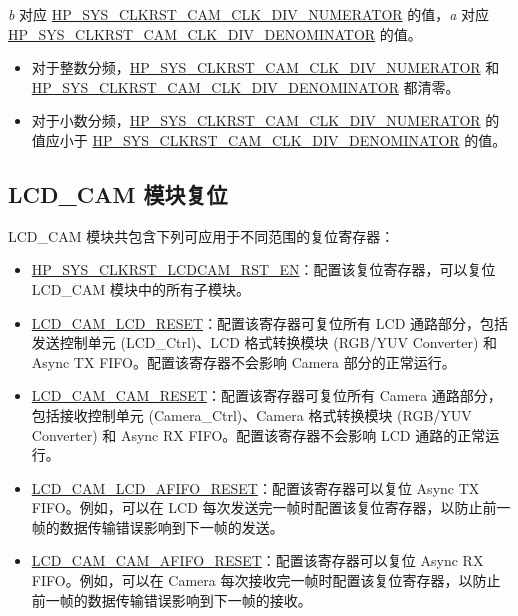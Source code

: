 \documentclass[main\_\_CN.tex]{subfiles}
\begin{document}
\textit{b} 对应 \hyperref[fielddesc:HPSYSCLKRSTCAMCLKDIVNUMERATOR]{HP\_SYS\_CLKRST\_CAM\_CLK\_DIV\_NUMERATOR} 的值，\textit{a} 对应 \hyperref[fielddesc:HPSYSCLKRSTCAMCLKDIVDENOMINATOR]{HP\_SYS\_CLKRST\_CAM\_CLK\_DIV\_DENOMINATOR} 的值。
\begin{itemize}
    \item 对于整数分频，\hyperref[fielddesc:HPSYSCLKRSTCAMCLKDIVNUMERATOR]{HP\_SYS\_CLKRST\_CAM\_CLK\_DIV\_NUMERATOR} 和 \hyperref[fielddesc:HPSYSCLKRSTCAMCLKDIVDENOMINATOR]{HP\_SYS\_CLKRST\_CAM\_CLK\_DIV\_DENOMINATOR} 都清零。
    \item 对于小数分频，\hyperref[fielddesc:HPSYSCLKRSTCAMCLKDIVNUMERATOR]{HP\_SYS\_CLKRST\_CAM\_CLK\_DIV\_NUMERATOR} 的值应小于 \hyperref[fielddesc:HPSYSCLKRSTCAMCLKDIVDENOMINATOR]{HP\_SYS\_CLKRST\_CAM\_CLK\_DIV\_DENOMINATOR} 的值。
\end{itemize}

\subsection{LCD\_CAM 模块复位} \label{sec:lcdcam_reset}

LCD\_CAM 模块共包含下列可应用于不同范围的复位寄存器：

\begin{itemize}
\item \hyperref[fielddesc:HPSYSCLKRSTLCDCAMRSTEN]{HP\_SYS\_CLKRST\_LCDCAM\_RST\_EN}：配置该复位寄存器，可以复位 LCD\_CAM 模块中的所有子模块。
\item \hyperref[fielddesc:LCDCAMLCDRESET]{LCD\_CAM\_LCD\_RESET}：配置该寄存器可复位所有 LCD 通路部分，包括发送控制单元 (LCD\_Ctrl)、LCD 格式转换模块 (RGB/YUV Converter) 和 Async TX FIFO。配置该寄存器不会影响 Camera 部分的正常运行。
\item \hyperref[fielddesc:LCDCAMCAMRESET]{LCD\_CAM\_CAM\_RESET}：配置该寄存器可复位所有 Camera 通路部分，包括接收控制单元 (Camera\_Ctrl)、Camera 格式转换模块 (RGB/YUV Converter) 和 Async RX FIFO。配置该寄存器不会影响 LCD 通路的正常运行。
\item \hyperref[fielddesc:LCDCAMLCDAFIFORESET]{LCD\_CAM\_LCD\_AFIFO\_RESET}：配置该寄存器可以复位 Async TX FIFO。例如，可以在 LCD 每次发送完一帧时配置该复位寄存器，以防止前一帧的数据传输错误影响到下一帧的发送。
\item \hyperref[fielddesc:LCDCAMCAMAFIFORESET]{LCD\_CAM\_CAM\_AFIFO\_RESET}：配置该寄存器可以复位 Async RX FIFO。例如，可以在 Camera 每次接收完一帧时配置该复位寄存器，以防止前一帧的数据传输错误影响到下一帧的接收。
\end{itemize}
\end{document}
